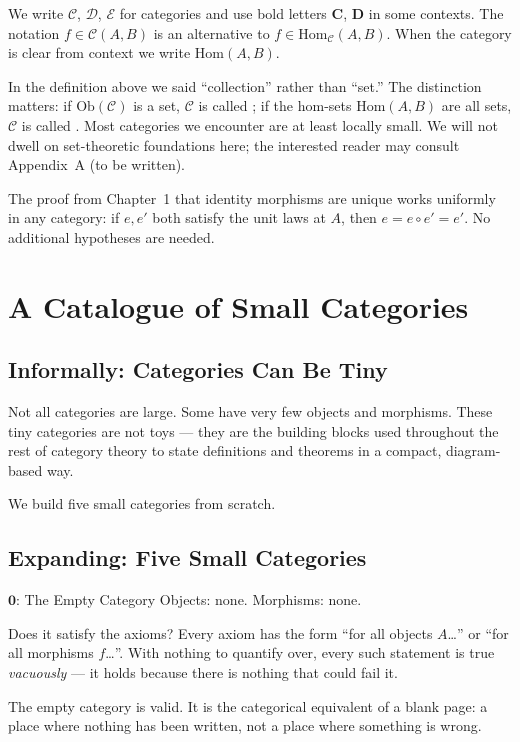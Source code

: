 We write $\mathcal{C}$, $\mathcal{D}$, $\mathcal{E}$ for categories and
use bold letters $\mathbf{C}$, $\mathbf{D}$ in some contexts. The notation
$f \in \mathcal{C}(A, B)$ is an alternative to $f \in \mathrm{Hom}_\mathcal{C}(A,B)$.
When the category is clear from context we write $\mathrm{Hom}(A,B)$.

In the definition above we said ``collection'' rather than ``set.'' The
distinction matters: if $\mathrm{Ob}(\mathcal{C})$ is a set, $\mathcal{C}$
is called ; if the hom-sets $\mathrm{Hom}(A,B)$ are all sets,
$\mathcal{C}$ is called . Most categories we encounter are
at least locally small. We will not dwell on set-theoretic foundations here;
the interested reader may consult Appendix~A (to be written).

The proof from Chapter~1 that identity morphisms are unique works
uniformly in any category: if $e, e'$ both satisfy the unit laws at $A$,
then $e = e \circ e' = e'$. No additional hypotheses are needed.


\section{A Catalogue of Small Categories}
\label{sec:small-categories}

\subsection{Informally: Categories Can Be Tiny}

Not all categories are large. Some have very few objects and morphisms.
These tiny categories are not toys --- they are the building blocks used
throughout the rest of category theory to state definitions and theorems
in a compact, diagram-based way.

We build five small categories from scratch.

\subsection{Expanding: Five Small Categories}

\begin{example}{$\mathbf{0}$: The Empty Category}
Objects: none. Morphisms: none.

Does it satisfy the axioms? Every axiom has the form ``for all objects
$A$\ldots'' or ``for all morphisms $f$\ldots''. With nothing to quantify over,
every such statement is true \emph{vacuously} --- it holds because there is
nothing that could fail it.

The empty category is valid. It is the categorical equivalent of a blank
page: a place where nothing has been written, not a place where something
is wrong.
\end{example}

